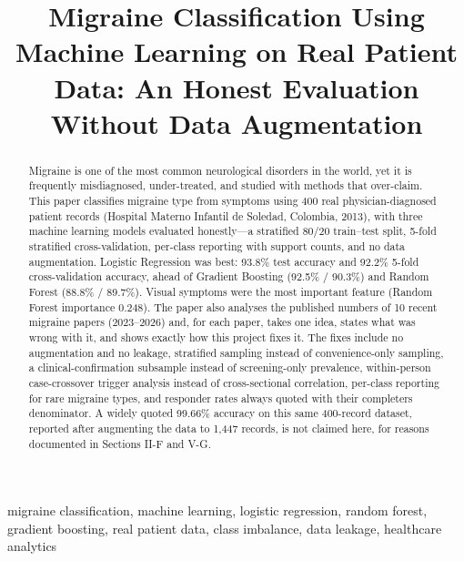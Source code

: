 \documentclass[conference]{IEEEtran}
\begin{document}
\title{Migraine Classification Using Machine Learning on Real Patient Data: An Honest Evaluation Without Data Augmentation}

\author{
}

\maketitle

\begin{abstract}
Migraine is one of the most common neurological disorders in the world, yet it is frequently misdiagnosed, under-treated, and studied with methods that over-claim. This paper classifies migraine type from symptoms using 400 real physician-diagnosed patient records (Hospital Materno Infantil de Soledad, Colombia, 2013), with three machine learning models evaluated honestly---a stratified 80/20 train--test split, 5-fold stratified cross-validation, per-class reporting with support counts, and no data augmentation. Logistic Regression was best: 93.8\% test accuracy and 92.2\% 5-fold cross-validation accuracy, ahead of Gradient Boosting (92.5\% / 90.3\%) and Random Forest (88.8\% / 89.7\%). Visual symptoms were the most important feature (Random Forest importance 0.248). The paper also analyses the published numbers of 10 recent migraine papers (2023--2026) and, for each paper, takes one idea, states what was wrong with it, and shows exactly how this project fixes it. The fixes include no augmentation and no leakage, stratified sampling instead of convenience-only sampling, a clinical-confirmation subsample instead of screening-only prevalence, within-person case-crossover trigger analysis instead of cross-sectional correlation, per-class reporting for rare migraine types, and responder rates always quoted with their completers denominator. A widely quoted 99.66\% accuracy on this same 400-record dataset, reported after augmenting the data to 1,447 records, is not claimed here, for reasons documented in Sections II-F and V-G.
\end{abstract}

\begin{IEEEkeywords}
migraine classification, machine learning, logistic regression, random forest, gradient boosting, real patient data, class imbalance, data leakage, healthcare analytics
\end{IEEEkeywords}
\end{document}
